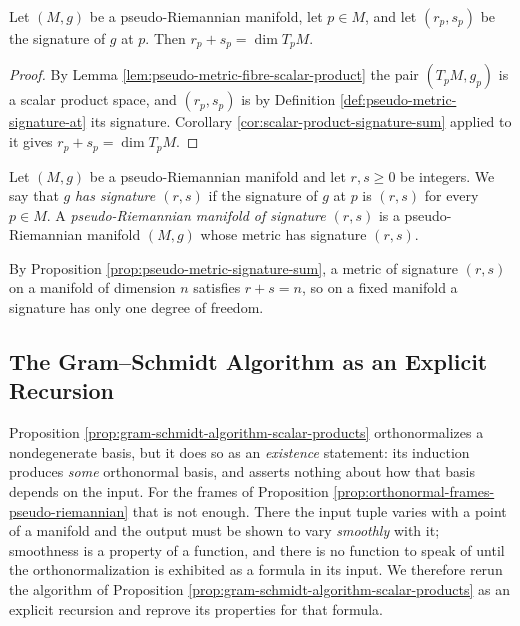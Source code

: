 \begin{proposition}
\label{prop:pseudo-metric-signature-sum}
\leanok
{}
Let $(M,g)$ be a pseudo-Riemannian manifold, let $p \in M$, and let $(r_p,s_p)$ be the signature of $g$ at $p$. Then $r_p + s_p = \dim T_pM$.
\end{proposition}

\begin{proof}
\leanok
{}
By Lemma \ref{lem:pseudo-metric-fibre-scalar-product} the pair $(T_pM, g_p)$ is a scalar product space, and $(r_p,s_p)$ is by Definition \ref{def:pseudo-metric-signature-at} its signature. Corollary \ref{cor:scalar-product-signature-sum} applied to it gives $r_p + s_p = \dim T_pM$.
\end{proof}

\begin{definition}
\label{def:pseudo-metric-has-signature}
\leanok
{}
Let $(M,g)$ be a pseudo-Riemannian manifold and let $r,s \geq 0$ be integers. We say that $g$ \emph{has signature $(r,s)$} if the signature of $g$ at $p$ is $(r,s)$ for every $p \in M$. A \emph{pseudo-Riemannian manifold of signature $(r,s)$} is a pseudo-Riemannian manifold $(M,g)$ whose metric has signature $(r,s)$.
\end{definition}

By Proposition \ref{prop:pseudo-metric-signature-sum}, a metric of signature $(r,s)$ on a manifold of dimension $n$ satisfies $r + s = n$, so on a fixed manifold a signature has only one degree of freedom.

\subsection{The Gram--Schmidt Algorithm as an Explicit Recursion}

Proposition \ref{prop:gram-schmidt-algorithm-scalar-products} orthonormalizes a nondegenerate basis, but it does so as an \emph{existence} statement: its induction produces \emph{some} orthonormal basis, and asserts nothing about how that basis depends on the input. For the frames of Proposition \ref{prop:orthonormal-frames-pseudo-riemannian} that is not enough. There the input tuple varies with a point of a manifold and the output must be shown to vary \emph{smoothly} with it; smoothness is a property of a function, and there is no function to speak of until the orthonormalization is exhibited as a formula in its input. We therefore rerun the algorithm of Proposition \ref{prop:gram-schmidt-algorithm-scalar-products} as an explicit recursion and reprove its properties for that formula.

